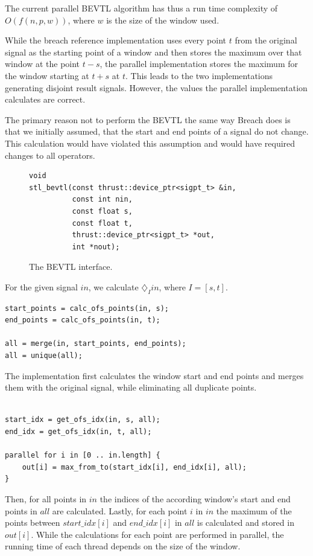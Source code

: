 \documentclass[a4paper,10pt]{article}
\newcommand{\Bevtl}{\diamondsuit_I}
\begin{document}
The current parallel BEVTL algorithm has thus a run time complexity of $O(f(n,p,w))$,
where $w$ is the size of the window used.

While the breach reference implementation uses every point $t$ from the original
signal as the starting point of a window and then stores the maximum over that window
at the point $t - s$, the parallel implementation stores the maximum for the window
starting at $t + s$ at $t$. This leads to the two implementations generating disjoint
result signals. However, the values the parallel implementation calculates are
correct.

The primary reason not to perform the BEVTL the same way Breach does is that we
initially assumed, that the start and end points of a signal do not change. This
calculation would have violated this assumption and would have required changes to
all operators.

\begin{figure}[H]
\begin{lstlisting}
void
stl_bevtl(const thrust::device_ptr<sigpt_t> &in,
          const int nin,
          const float s,
          const float t,
          thrust::device_ptr<sigpt_t> *out,
          int *nout);
\end{lstlisting}
\caption{
\label{fig:parallel_bevtl}
The BEVTL interface.}
\end{figure}

For the given signal $in$, we calculate $\Bevtl in$, where $I = [s,t]$.

\begin{lstlisting}
start_points = calc_ofs_points(in, s);
end_points = calc_ofs_points(in, t);

all = merge(in, start_points, end_points);
all = unique(all);
\end{lstlisting}

The implementation first calculates the window start and end points and merges them
with the original signal, while eliminating all duplicate points.

\begin{lstlisting}

start_idx = get_ofs_idx(in, s, all);
end_idx = get_ofs_idx(in, t, all);

parallel for i in [0 .. in.length] {
    out[i] = max_from_to(start_idx[i], end_idx[i], all);
}

\end{lstlisting}

Then, for all points in $in$ the indices of the according window's start and end
points in $all$ are calculated. Lastly, for each point $i$ in $in$ the maximum of the
points between $start\_idx[i]$ and $end\_idx[i]$ in $all$ is calculated and stored in
$out[i]$. While the calculations for each point are performed in parallel, the
running time of each thread depends on the size of the window.
\end{document}
